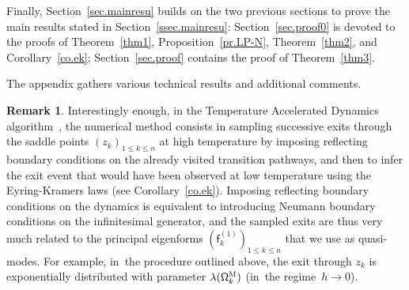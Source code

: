 \documentclass[JEP,XML,SOM,Unicode,NoEqCountersInSection,NoFloatCountersInSection,published]{cedram}
\theoremstyle{plain}
\theoremstyle{definition}
\newtheorem{remark}[proposition]{Remark}
\begin{document}
Finally, Section~\ref{sec.mainresu} builds on the two previous sections
to prove the main results stated in Section~\ref{ssec.mainresu}: Section~\ref{sec.proof0} is devoted to the
proofs of Theorem~\ref{thm1}, Proposition~\ref{pr.LP-N},
Theorem~\ref{thm2}, and Corollary~\ref{co.ek}; Section~\ref{sec.proof}
contains the proof of Theorem~\ref{thm3}.

The appendix gathers various technical results and additional comments.

\begin{remark}\label{rem:TAD}
Interestingly enough, in
the Temperature Accelerated Dynamics
algorithm~\cite{sorensen-voter-00,aristoff-lelievre-14,di-gesu-lelievre-le-peutrec-nectoux-17}, the numerical method
consists in sampling successive exits through the saddle points
$(z_k)_{1 \le k \le n}$ at high temperature by imposing reflecting boundary conditions on
the already visited transition pathways, and then to infer the
exit event that would have been observed at low temperature using the
Eyring-Kramers laws (see Corollary~\ref{co.ek}). Imposing reflecting boundary conditions on
the dynamics is
equivalent to introducing Neumann boundary conditions on the
infinitesimal generator, and the sampled exits are thus very much
related to the principal eigenforms $(\mathsf f_k^{(1)})_{1 \le k \le n}$ that we use
as quasi-modes. For example, in~the procedure outlined above, the exit through $z_k$ is exponentially
distributed with parameter $\lambda(\mathsf
\Omega_k^{\textsc{M}})$ (in~the regime~$h \to 0$).
\end{remark}
\end{document}
